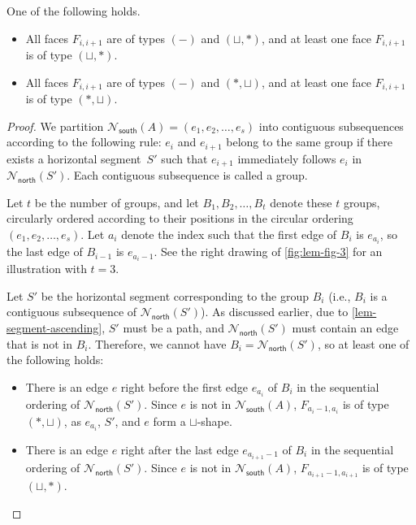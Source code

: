 \documentclass{theoretics}
\newcommand{\Nnorth}{\mathcal{N}_\mathsf{north}}
\newcommand{\Nsouth}{\mathcal{N}_\mathsf{south}}
\begin{document}
\begin{lemma}\label{lem-all-ascending}
One of the following holds.
\begin{itemize}
    \item All faces $F_{i,i+1}$ are of  types $(-)$ and $(\sqcup,\ast)$, and at least one face $F_{i,i+1}$ is of  type $(\sqcup,\ast)$.
     \item All faces $F_{i,i+1}$ are of  types $(-)$ and $(\ast,\sqcup)$, and at least one face $F_{i,i+1}$ is of  type $(\ast,\sqcup)$.
\end{itemize}
\end{lemma}
\begin{proof}
We partition $\Nsouth(A) = (e_{1}, e_{2}, \ldots, e_{s})$ into contiguous subsequences according to the following rule: $e_i$ and $e_{i+1}$ belong to the same group if there exists a horizontal segment~$S'$ such that $e_{i+1}$ immediately follows $e_i$ in $\Nnorth(S')$. Each contiguous subsequence is called a group.


Let $t$ be the number of groups, and let $B_1, B_2, \ldots, B_t$ denote these 
 $t$ groups, circularly ordered according to their positions in the circular ordering $(e_{1}, e_{2}, \ldots, e_{s})$. Let $a_i$ denote the index such that the first edge of $B_i$ is $e_{a_i}$, so the last edge of $B_{i-1}$ is $e_{a_i - 1}$. See the right drawing of \cref{fig:lem-fig-3} for an illustration with $t=3$.

Let $S'$ be the horizontal segment corresponding to the group $B_i$ (i.e., $B_i$ is a contiguous subsequence of $\Nnorth(S')$). As discussed earlier, due to \cref{lem-segment-ascending}, $S'$ must be a path, and $\Nnorth(S')$ must contain an edge that is not in $B_i$. Therefore, we cannot have $B_i = \Nnorth(S')$, so at least one of the following holds:
\begin{itemize}
    \item There is an edge $e$ right before the first edge $e_{a_i}$ of $B_i$ in the sequential ordering of $\Nnorth(S')$. 
    Since $e$ is not in $\Nsouth(A)$, $F_{a_i - 1, a_i}$ is of type $(\ast,\sqcup)$, as $e_{a_i}$, $S'$, and $e$ form a $\sqcup$-shape.
    \item There is an edge $e$ right after the last edge $e_{a_{i+1}-1}$ of $B_i$ in the sequential ordering of $\Nnorth(S')$. 
    Since $e$ is not in $\Nsouth(A)$, $F_{a_{i+1}-1, a_{i+1}}$ is of type $(\sqcup,\ast)$.
\end{itemize}






\end{proof}
\end{document}
